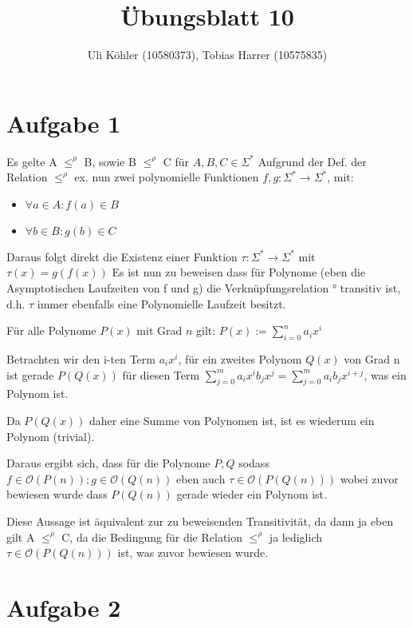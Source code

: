 \documentclass[a4paper,10pt,oneside,leqno]{scrartcl}
\title{Übungsblatt 10}
\author{Uli Köhler (10580373), Tobias Harrer (10575835)}
\begin{document}
\maketitle
\section*{Aufgabe 1}
Es gelte A $\leq^{\rho}$ B, sowie B $\leq^{\rho}$ C für $A,B,C \in \Sigma^*$
Aufgrund der Def. der Relation $\leq^{\rho}$ ex. nun zwei polynomielle Funktionen
$f, g : \Sigma^* \rightarrow \Sigma^*$, mit:
\begin{itemize}
 \item $\forall a \in A: f(a) \in B$
 \item $\forall b \in B: g(b) \in C$
\end{itemize}
Daraus folgt direkt die Existenz einer Funktion $\tau : \Sigma^* \rightarrow \Sigma^*$ mit $\tau(x) = g(f(x))$
Es ist nun zu beweisen dass für Polynome (eben die Asymptotischen Laufzeiten von f und g) die Verknüpfungsrelation ° transitiv ist,
d.h. $\tau$ immer ebenfalls eine Polynomielle Laufzeit besitzt.

Für alle Polynome $P(x)$ mit Grad $n$ gilt: $P(x) := \sum^n_{i=0}a_ix^i$

Betrachten wir den i-ten Term $a_ix^i$, für ein zweites Polynom $Q(x)$ von Grad n ist gerade
$P(Q(x))$ für diesen Term $\sum^m_{j=0}a_ix^ib_jx^j = \sum^m_{j=0}a_ib_jx^{i+j}$, was ein Polynom ist.

Da $P(Q(x))$ daher eine Summe von Polynomen ist, ist es wiederum ein Polynom (trivial).

Daraus ergibt sich, dass für die Polynome $P,Q$ sodass $f \in \mathcal{O}(P(n)) ; g \in \mathcal{O}(Q(n))$ eben auch
$\tau \in \mathcal{O}(P(Q(n)))$ wobei zuvor bewiesen wurde dass $P(Q(n))$ gerade wieder ein Polynom ist.

Diese Aussage ist äquivalent zur zu beweisenden Transitivität, da dann ja eben gilt A $\leq^{\rho}$ C,
da die Bedingung für die Relation $\leq^{\rho}$ ja lediglich  $\tau \in \mathcal{O}(P(Q(n)))$ ist, was zuvor bewiesen wurde.

\section*{Aufgabe 2}
\end{document}
